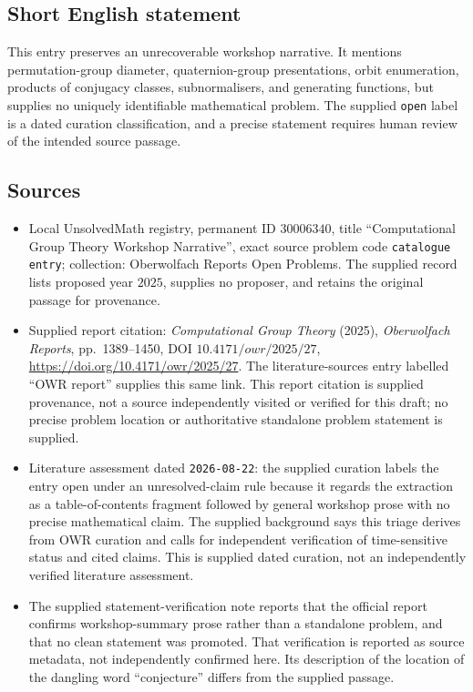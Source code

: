\documentclass[11pt]{article}
\begin{document}
\subsection{Short English statement}
This entry preserves an unrecoverable workshop narrative. It mentions permutation-group diameter, quaternion-group presentations, orbit enumeration, products of conjugacy classes, subnormalisers, and generating functions, but supplies no uniquely identifiable mathematical problem. The supplied \texttt{open} label is a dated curation classification, and a precise statement requires human review of the intended source passage.
\subsection{Sources}
\begin{itemize}
\item Local UnsolvedMath registry, permanent ID \(30006340\), title ``Computational Group Theory Workshop Narrative'', exact source problem code \texttt{catalogue entry}; collection: Oberwolfach Reports Open Problems. The supplied record lists proposed year \(2025\), supplies no proposer, and retains the original passage for provenance.
\item Supplied report citation: \emph{Computational Group Theory} (2025), \emph{Oberwolfach Reports}, pp.\ 1389--1450, DOI \(10.4171/owr/2025/27\), \url{https://doi.org/10.4171/owr/2025/27}. The literature-sources entry labelled ``OWR report'' supplies this same link. This report citation is supplied provenance, not a source independently visited or verified for this draft; no precise problem location or authoritative standalone problem statement is supplied.
\item Literature assessment dated \texttt{2026-08-22}: the supplied curation labels the entry open under an unresolved-claim rule because it regards the extraction as a table-of-contents fragment followed by general workshop prose with no precise mathematical claim. The supplied background says this triage derives from OWR curation and calls for independent verification of time-sensitive status and cited claims. This is supplied dated curation, not an independently verified literature assessment.
\item The supplied statement-verification note reports that the official report confirms workshop-summary prose rather than a standalone problem, and that no clean statement was promoted. That verification is reported as source metadata, not independently confirmed here. Its description of the location of the dangling word ``conjecture'' differs from the supplied passage.

\end{itemize}
\end{document}
